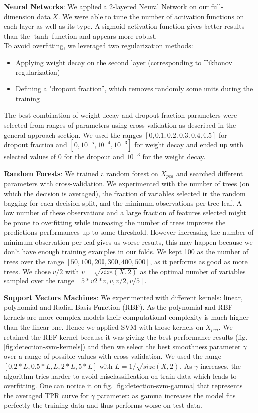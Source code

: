 \documentclass[10pt,a4paper]{article}
\begin{document}
    \textbf{Neural Networks}: We applied a 2-layered Neural Network on our full-dimension data $X$. We were able to tune the number of activation functions on each layer as well as its type. A sigmoid activation function gives better results than the $\tanh$ function and appears more robust.\\
  To avoid overfitting, we leveraged two regularization methods:
  \begin{itemize}
   	\item Applying weight decay on the second layer (corresponding to Tikhonov regularization)
	  \item Defining a "dropout fraction'', which removes randomly some units during the training \cite{dropout}
  \end{itemize}
	The best combination of weight decay and dropout fraction parameters were selected from ranges of parameters using cross-validation as described in the general approach section. We used  the ranges $[0, 0.1, 0.2, 0.3, 0.4, 0.5]$ for dropout fraction and $[0, 10^{-5}, 10^{-4}, 10^{-3}]$ for weight decay and ended up with selected values of $0$ for the dropout and $10^{-3}$ for the weight decay.

    \textbf{Random Forests}: We trained a random forest on $X_{pca}$ and searched different parameters with cross-validation. We experimented with the number of trees (on which the decision is averaged), the fraction of variables selected in the random bagging for each decision split, and the minimum observations per tree leaf. A low number of these observations and a large fraction of features selected might be prone to overfitting while increasing the number of trees improves the predictions performances up to some threshold. However increasing the number of minimum observation per leaf gives us worse results, this may happen because we don't have enough training examples in our folds. We kept 100 as the number of trees over the range $[50, 100, 200, 300, 400, 500]$, as it performs as good as more trees. We chose $v/ 2$ with $v = \sqrt{size(X,2)}$ as the optimal number of variables sampled over the range $[5*v 2*v, v, v/ 2, v/ 5]$.

  \textbf{Support Vectors Machines}: We experimented with different kernels: linear, polynomial and Radial Basis Function (RBF). As the polynomial and RBF kernels are more complex models their computational complexity is much higher than the linear one. Hence we applied SVM with those kernels on $X_{pca}$. We retained the RBF kernel because it was giving the best performance results (fig. \ref{fig:detection-svm-kernels}) and then we select the best smoothness parameter $\gamma$ over a range of possible values with cross validation. We used the range $[0.2*L, 0.5*L, L, 2*L, 5*L]$ with $L = 1 / \sqrt{size(X,2)}$. As $\gamma$ increases, the algorithm tries harder to avoid misclassification on train data which leads to overfitting. One can notice it on fig. \ref{fig:detection-svm-gamma} that represents the averaged TPR curve for $\gamma$ parameter: as gamma increases the model fits perfectly the training data and thus performs worse on test data.
\end{document}
